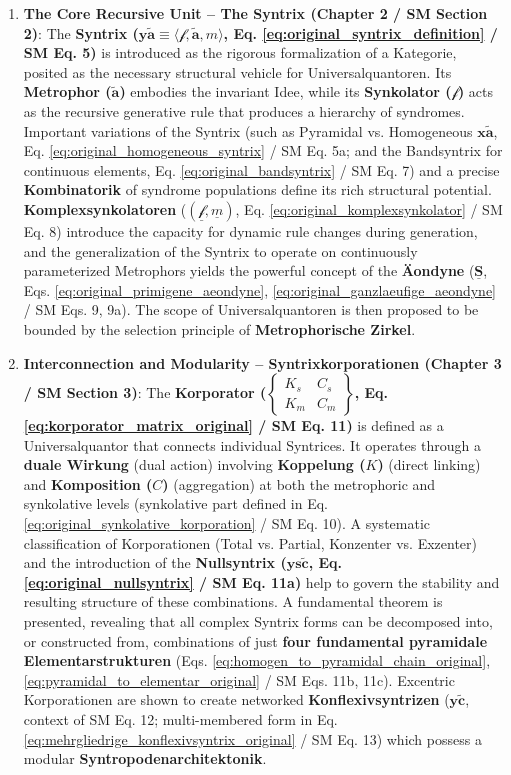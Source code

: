 \documentclass[
    12pt,              %
    a4paper,           %
    headings=normal,   %
    twoside=true,      %
    BCOR=8mm,          %
]{scrbook}
\newcommand{\syntrix}{\bm{y\widetilde{a}}}
\newcommand{\homogeneoussyntrix}{\bm{x\widetilde{a}}}
\newcommand{\metrophor}{\bm{\widetilde{a}}}
\newcommand{\synkolator}{\mathcal{f}}
\newcommand{\synkolationsstufe}{m}
\newcommand{\korporatoroperator}{\begin{Bmatrix} K_s & C_s \\ K_m & C_m \end{Bmatrix}}
\newcommand{\nullsyntrix}{\bm{ys\widetilde{c}}}
\newcommand{\konflexivsyntrix}{\bm{y\widetilde{c}}}
\begin{document}
\begin{enumerate}
    \item \textbf{The Core Recursive Unit – The Syntrix (Chapter 2 / SM Section 2)}: The \textbf{Syntrix (\( \syntrix \equiv \langle \synkolator, \metrophor, \synkolationsstufe \rangle \), Eq. \eqref{eq:original_syntrix_definition} / SM Eq. 5)} is introduced as the rigorous formalization of a Kategorie, posited as the necessary structural vehicle for Universalquantoren. Its \textbf{Metrophor (\( \metrophor \))} embodies the invariant Idee, while its \textbf{Synkolator (\( \synkolator \))} acts as the recursive generative rule that produces a hierarchy of syndromes. Important variations of the Syntrix (such as Pyramidal vs. Homogeneous \( \homogeneoussyntrix \), Eq. \eqref{eq:original_homogeneous_syntrix} / SM Eq. 5a; and the Bandsyntrix for continuous elements, Eq. \eqref{eq:original_bandsyntrix} / SM Eq. 7) and a precise \textbf{Kombinatorik} of syndrome populations define its rich structural potential. \textbf{Komplexsynkolatoren} (\( (\underline{\synkolator}, \underline{\synkolationsstufe}) \), Eq. \eqref{eq:original_komplexsynkolator} / SM Eq. 8) introduce the capacity for dynamic rule changes during generation, and the generalization of the Syntrix to operate on continuously parameterized Metrophors yields the powerful concept of the \textbf{Äondyne} (\( \underline{\bm{S}} \), Eqs. \eqref{eq:original_primigene_aeondyne}, \eqref{eq:original_ganzlaeufige_aeondyne} / SM Eqs. 9, 9a). The scope of Universalquantoren is then proposed to be bounded by the selection principle of \textbf{Metrophorische Zirkel}.

    \item \textbf{Interconnection and Modularity – Syntrixkorporationen (Chapter 3 / SM Section 3)}: The \textbf{Korporator (\( \korporatoroperator \), Eq. \eqref{eq:korporator_matrix_original} / SM Eq. 11)} is defined as a Universalquantor that connects individual Syntrices. It operates through a \textbf{duale Wirkung} (dual action) involving \textbf{Koppelung (\( K \))} (direct linking) and \textbf{Komposition (\( C \))} (aggregation) at both the metrophoric and synkolative levels (synkolative part defined in Eq. \eqref{eq:original_synkolative_korporation} / SM Eq. 10). A systematic classification of Korporationen (Total vs. Partial, Konzenter vs. Exzenter) and the introduction of the \textbf{Nullsyntrix (\( \nullsyntrix \), Eq. \eqref{eq:original_nullsyntrix} / SM Eq. 11a)} help to govern the stability and resulting structure of these combinations. A fundamental theorem is presented, revealing that all complex Syntrix forms can be decomposed into, or constructed from, combinations of just \textbf{four fundamental pyramidale Elementarstrukturen} (Eqs. \eqref{eq:homogen_to_pyramidal_chain_original}, \eqref{eq:pyramidal_to_elementar_original} / SM Eqs. 11b, 11c). Excentric Korporationen are shown to create networked \textbf{Konflexivsyntrizen} (\( \konflexivsyntrix \), context of SM Eq. 12; multi-membered form in Eq. \eqref{eq:mehrgliedrige_konflexivsyntrix_original} / SM Eq. 13) which possess a modular \textbf{Syntropodenarchitektonik}.


\end{enumerate}
\end{document}
